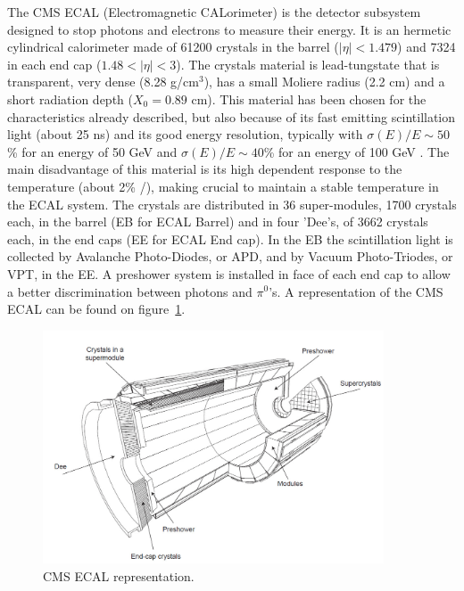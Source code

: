 The CMS ECAL (Electromagnetic CALorimeter) is the detector subsystem designed to stop photons and electrons to measure their energy. It is an hermetic cylindrical calorimeter made of 61200 crystals in the barrel ($|\eta|<1.479$) and 7324 in each end cap ($1.48<|\eta|<3$). The crystals material is lead-tungstate that is transparent, very dense (8.28 g/$\text{cm}^{3}$), has a small Moliere radius (2.2 cm) and a short radiation depth ($X_{0}=0.89$ cm). This material has been chosen for the characteristics already described, but also because of its fast emitting scintillation light (about 25 ns) and its good energy resolution, typically with $\sigma(E)/E\sim 50$\% for an energy of 50 GeV and $\sigma(E)/E\sim 40$\% for an energy of 100 GeV . The main disadvantage of this material is its high dependent response to the temperature (about 2\% /\celsius), making crucial to maintain a stable temperature in the ECAL system. The crystals are distributed in 36 super-modules, 1700 crystals each, in the barrel (EB for ECAL Barrel) and in four 'Dee's, of 3662 crystals each, in the end caps (EE for ECAL End cap). In the EB the scintillation light is collected by Avalanche Photo-Diodes, or APD, and by Vacuum Photo-Triodes, or VPT, in the EE. A preshower system is installed in face of each end cap to allow a better discrimination between photons and $\pi^{0}$'s. A representation of the CMS ECAL can be found on figure~\ref{fig:ecal}.

\begin{figure}[!Hhtbp]
  \begin{center}
    \includegraphics[width=0.9\textwidth]{figs/ECAL.png}
    \caption{CMS ECAL representation. }
    \label{fig:ecal}
  \end{center}
\end{figure}

